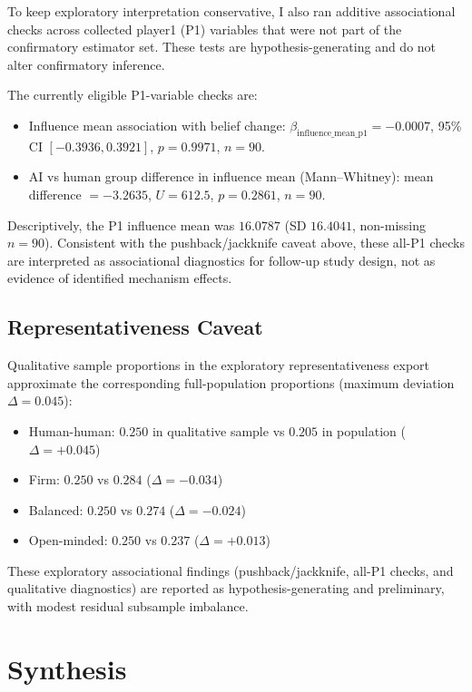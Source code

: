 To keep exploratory interpretation conservative, I also ran additive
associational checks across collected player1 (P1) variables that were not part
of the confirmatory estimator set. These tests are hypothesis-generating and do
not alter confirmatory inference.

The currently eligible P1-variable checks are:
\begin{itemize}
    \item Influence mean association with belief change:
        $\beta_{\text{influence\_mean\_p1}}=-0.0007$, 95\% CI $[-0.3936,0.3921]$,
        $p=0.9971$, $n=90$.
    \item AI vs human group difference in influence mean (Mann--Whitney):
        mean difference $=-3.2635$, $U=612.5$, $p=0.2861$, $n=90$.
\end{itemize}

Descriptively, the P1 influence mean was $16.0787$ (SD $16.4041$, non-missing
$n=90$). Consistent with the pushback/jackknife caveat above, these all-P1
checks are interpreted as associational diagnostics for follow-up study design,
not as evidence of identified mechanism effects.

\subsection{Representativeness Caveat}

Qualitative sample proportions in the exploratory representativeness export
approximate the corresponding full-population proportions (maximum deviation $\Delta=0.045$):
\begin{itemize}
    \item Human-human: $0.250$ in qualitative sample vs $0.205$ in population ($\Delta=+0.045$)
    \item Firm: $0.250$ vs $0.284$ ($\Delta=-0.034$)
    \item Balanced: $0.250$ vs $0.274$ ($\Delta=-0.024$)
    \item Open-minded: $0.250$ vs $0.237$ ($\Delta=+0.013$)
\end{itemize}

These exploratory associational findings (pushback/jackknife, all-P1 checks,
and qualitative diagnostics) are reported as hypothesis-generating and preliminary,
with modest residual subsample imbalance.

\pagebreak
\section{Synthesis}

